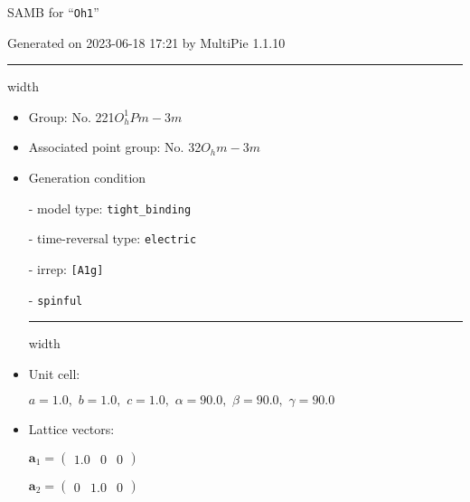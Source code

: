 \documentclass[fleqn,10pt,landscape]{article}
\begin{document}
\setcounter{MaxMatrixCols}{16}

\setlength{\baselineskip}{16pt}
\footnotesize
\begin{center}
\LARGE
SAMB for ``\texttt{Oh1}''
\end{center}
\begin{flushright}
Generated on 2023-06-18 17:21 by MultiPie 1.1.10
\end{flushright}
\vspace{1cm}


 \hfil \hrule height 1mm width \textwidth \hfil

\begin{itemize}
\item Group: No. 221\quad$O_{h}^{1}$\quad$Pm-3m$\quad[ cubic ]

\item Associated point group: No. 32\quad$O_{h}$\quad$m-3m$\quad[ cubic ]

\vspace{5mm}

\item Generation condition

\quad - model type: \texttt{tight_binding}

\quad - time-reversal type: \texttt{electric}

\quad - irrep: \texttt{[A1g]}

\quad - \texttt{spinful}


 \hfil \hrule height 1mm width \textwidth \hfil

\item Unit cell:

\quad $a=1.0,\,\, b=1.0,\,\, c=1.0,\,\, \alpha=90.0,\,\, \beta=90.0,\,\, \gamma=90.0$

\item Lattice vectors:

\quad $\bm{a}_1=\begin{pmatrix} 1.0 & 0 & 0 \end{pmatrix}$

\quad $\bm{a}_2=\begin{pmatrix} 0 & 1.0 & 0 \end{pmatrix}$


\end{itemize}
\end{document}

